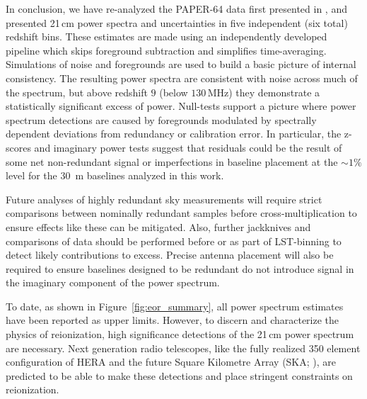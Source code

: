 In conclusion, we have re-analyzed the PAPER-64 data first presented in ,
 and presented 21\,cm
power spectra and uncertainties in five independent (six total) redshift bins. These estimates
are made using an independently developed pipeline
which skips foreground subtraction and simplifies time-averaging. Simulations
of noise and foregrounds are used to build a basic picture of
internal consistency. The resulting power spectra are consistent with noise
across much of the spectrum, but above redshift $9$ (below $130$\,MHz) they demonstrate
a statistically significant excess of power. Null-tests support a picture where
power spectrum detections are caused by foregrounds modulated by
spectrally dependent deviations from redundancy or calibration error.
In particular, the z-scores and imaginary power tests suggest that residuals
could be the result of some net non-redundant signal
or imperfections in baseline placement at the
$ \sim 1\% $ level for the $ 30 $~m baselines
analyzed in this work.

Future analyses of highly redundant sky
measurements will require strict comparisons
between nominally redundant samples before
cross-multiplication to ensure effects like
these can be mitigated. Also, further jackknives
and comparisons of data should be performed before or as part of LST-binning
to detect likely contributions to excess.
Precise antenna placement will also be required
to ensure baselines designed to be redundant do not
introduce signal in the imaginary component of the power spectrum.

To date, as shown in Figure~\ref{fig:eor_summary}, all power spectrum estimates have been reported as
upper limits. However, to discern and characterize the physics
of reionization, high significance detections of the 21\,cm power
spectrum are necessary.
Next generation radio telescopes,
like the fully realized 350 element configuration of HERA
\citep{pober_et_al2014,deboer_et_al2017,liu_parsons_2016}
and the
future Square Kilometre Array (SKA; \citet{mellema:2013}), are predicted to
be able to make these detections and place stringent constraints
on reionization.



